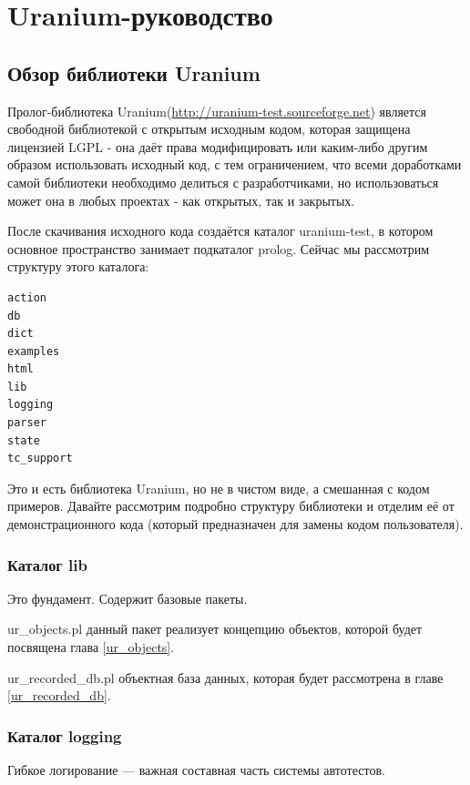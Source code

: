 \documentclass[a4paper]{book}
\def\ur{Uranium}
\begin{document}
\part{\ur-руководство}
\chapter{Обзор библиотеки \ur}

Пролог-библиотека \ur (\url{http://uranium-test.sourceforge.net})
является свободной библиотекой с открытым исходным кодом, которая
защищена лицензией LGPL - она даёт права модифицировать или
каким-либо другим образом использовать исходный код, с тем
ограничением, что всеми доработками самой библиотеки необходимо
делиться с разработчиками, но использоваться может она в любых
проектах - как открытых, так и закрытых.

После скачивания исходного кода создаётся каталог uranium-test, в
котором основное пространство занимает подкаталог prolog. Сейчас
мы рассмотрим структуру этого каталога:

\begin{verbatim}
action
db
dict
examples
html
lib
logging
parser
state
tc_support
\end{verbatim}

Это и есть библиотека \ur, но не в чистом виде, а смешанная с
кодом примеров. Давайте рассмотрим подробно структуру библиотеки
и отделим её от демонстрационного кода (который предназначен для
замены кодом пользователя).

\section{Каталог lib}

Это фундамент. Содержит базовые пакеты.

\begin{description} 
\item ur\_objects.pl данный пакет реализует концепцию
  объектов, которой будет посвящена глава \ref{ur_objects}.
\item ur\_recorded\_db.pl объектная база данных, которая
  будет рассмотрена в главе \ref{ur_recorded_db}.
\end{description}

\section{Каталог logging}

Гибкое логирование --- важная составная часть системы автотестов.
\end{document}
